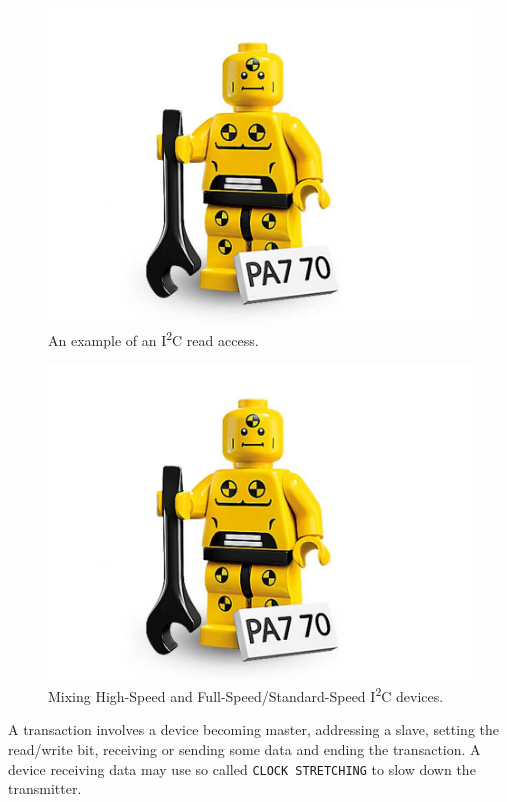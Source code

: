 \documentclass[journal]{IEEEtran}
\newcommand{\twi}{I\textsuperscript{2}C\xspace}
\newcommand{\clockstretching}{\texttt{CLOCK STRETCHING}\xspace}
\begin{document}
\begin{figure}[!t]
\centering
\includegraphics[width=0.95\linewidth]{dummy}
\caption{An example of an \twi read access.}
\label{i2c_transfer_complete}
\end{figure}

\begin{figure}[!t]
\centering
\includegraphics[width=0.95\linewidth]{dummy}
\caption{Mixing High-Speed and Full-Speed/Standard-Speed \twi devices.\cite{i2c_standard_v2.1}}
\label{i2c_complete_connection}
\end{figure}

A transaction involves a device becoming master, addressing a slave, setting the read/write bit, receiving or sending some data and ending the transaction.
A device receiving data may use so called \clockstretching to slow down the transmitter.
\end{document}
